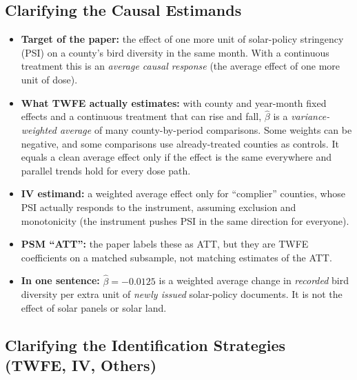 \documentclass[11pt]{article}
\begin{document}
\subsection{Clarifying the Causal Estimands}
\begin{itemize}
\item \textbf{Target of the paper:} the effect of one more unit of solar-policy stringency (PSI) on a county's bird diversity in the same month. With a continuous treatment this is an \emph{average causal response} (the average effect of one more unit of dose).
\item \textbf{What TWFE actually estimates:} with county and year-month fixed effects and a continuous treatment that can rise and fall, $\hat\beta$ is a \emph{variance-weighted average} of many county-by-period comparisons. Some weights can be negative, and some comparisons use already-treated counties as controls. It equals a clean average effect only if the effect is the same everywhere and parallel trends hold for every dose path.
\item \textbf{IV estimand:} a weighted average effect only for ``complier'' counties, whose PSI actually responds to the instrument, assuming exclusion and monotonicity (the instrument pushes PSI in the same direction for everyone).
\item \textbf{PSM ``ATT'':} the paper labels these as ATT, but they are TWFE coefficients on a matched subsample, not matching estimates of the ATT.
\item \textbf{In one sentence:} $\hat\beta=-0.0125$ is a weighted average change in \emph{recorded} bird diversity per extra unit of \emph{newly issued} solar-policy documents. It is not the effect of solar panels or solar land.
\end{itemize}

\subsection{Clarifying the Identification Strategies (TWFE, IV, Others)}
\end{document}
